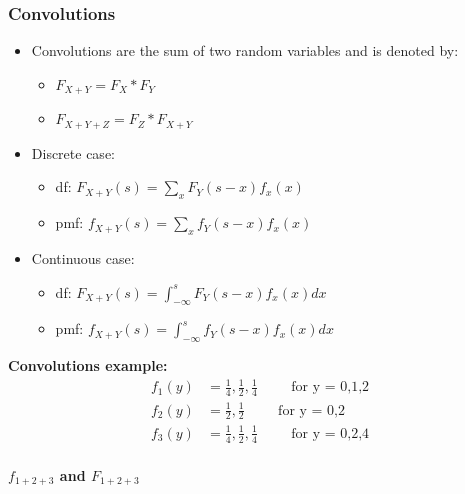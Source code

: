 \documentclass{article}
\begin{document}
\subsubsection{Convolutions}
\begin{itemize}
    \item Convolutions are the sum of two random variables and is denoted by:
    \begin{itemize}
        \item $F_{X+Y} = F_X * F_Y$
        \item $F_{X+Y+Z} = F_Z *  F_{X+Y}$
    \end{itemize}
    \item Discrete case:
    \begin{itemize}
        \item df: $F_{X+Y}(s) = \sum_x F_Y (s-x) f_x(x)$
        \item pmf: $f_{X+Y}(s) = \sum_x f_Y(s-x)f_x(x)$
    \end{itemize}
    \item Continuous case:
    \begin{itemize}
        \item df: $F_{X+Y}(s) = \int _{-\infty}^s F_Y (s-x) f_x(x) dx$
        \item pmf: $f_{X+Y}(s) = \int _{-\infty}^s f_Y(s-x)f_x(x) dx$
    \end{itemize}
\end{itemize}






\noindent\textbf{Convolutions example:}
\begin{align*}
    f_1(y) &= \frac{1}{4},\frac{1}{2},\frac{1}{4} \hspace{1cm}\text{for y = 0,1,2}\\
    f_2(y) &= \frac{1}{2},\frac{1}{2} \hspace{1cm}\text{for y = 0,2}\\
    f_3(y) &= \frac{1}{4},\frac{1}{2},\frac{1}{4} \hspace{1cm}\text{for y = 0,2,4}\\
\end{align*}

\textbf{$f_{1+2+3}$ and $F_{1+2+3}$}
\end{document}
